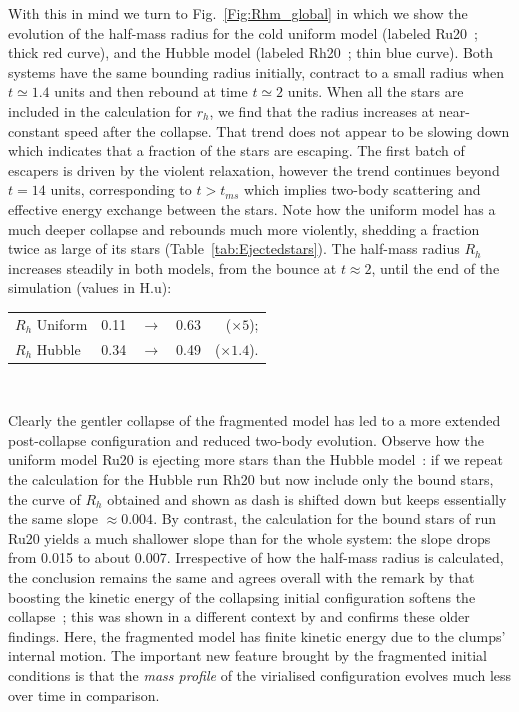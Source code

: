 With this in mind  we turn to Fig.~\ref{Fig:Rhm_global} in which we show the evolution of the half-mass radius for the cold uniform model (labeled Ru20~; thick red curve), and the Hubble model (labeled Rh20~; thin blue curve). Both systems have the same bounding radius initially, contract to a small radius when $t \simeq 1.4 $ units and then rebound at time $t \simeq 2 $ units. When all the stars are included in the calculation for $r_h$, we find that the radius increases at near-constant speed after the collapse. That trend does not appear to be slowing down which indicates that a fraction of the stars are escaping. The first batch of escapers is driven by the violent relaxation, however the trend continues beyond $ t = 14$ units, corresponding to $t > t_{ms}$ which implies two-body scattering and effective energy exchange between the stars. Note how the uniform model has a much deeper collapse and rebounds much more violently, shedding a fraction twice as large of its stars (Table~\ref{tab:Ejectedstars}). The half-mass radius $R_h$ increases steadily in both models, from the bounce at $t \approx 2$, until the end of the simulation (values in H.u):  
\begin{center}
\begin{tabular}{lllrr}
$R_h$ Uniform & 0.11 &  $\rightarrow$ & 0.63 & ($\times 5$); \\
$R_h$ Hubble & 0.34  &  $\rightarrow$ & 0.49 & ($\times 1.4$). \\
\end{tabular}\\
\end{center}

%
Clearly the gentler collapse of the fragmented model has led to a more extended post-collapse configuration and reduced two-body evolution. Observe how the uniform model Ru20 is ejecting more stars than the Hubble model~: if we repeat the calculation for the Hubble run Rh20 but now include only the bound stars, the curve of $R_h$ obtained and shown as dash is shifted down but keeps essentially the same slope $\approx  0.004$. By contrast, the calculation for the bound stars of run Ru20 yields a much shallower slope than for the whole system: the slope drops from 0.015 to about 0.007. Irrespective of how the half-mass radius is calculated, the conclusion remains the same and agrees overall with the remark by \cite{Caputo2014} that boosting the kinetic energy of the collapsing initial configuration softens the collapse~; this was shown in a different context by \cite{Theis1999} and confirms these older findings.  Here, the fragmented model has finite kinetic energy due to the clumps' internal motion. The important new feature brought by the fragmented initial conditions is that the {\it mass profile} of the virialised configuration evolves much less over time in comparison. 

